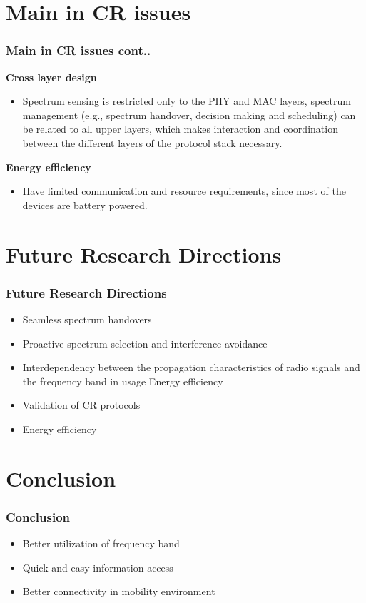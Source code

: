 \documentclass{beamer}
\begin{document}
\section{Main in CR issues}
\begin{frame}
\frametitle{Main in CR issues cont..}
\textbf{Cross layer design}\\
\begin{itemize}
\item Spectrum sensing is restricted only to the PHY and MAC layers, spectrum management (e.g., spectrum handover, decision making and scheduling) can be related to all upper layers, which makes interaction and coordination between the different layers of the protocol stack necessary.\\ 
\end{itemize}
\textbf{Energy efficiency}\\
\begin{itemize}
\item Have limited communication and resource requirements, since most of the devices are battery powered. 
\end{itemize}


\end{frame}


\section{Future Research Directions}
\begin{frame}
\frametitle{Future Research Directions}
\begin{itemize}
\item Seamless spectrum handovers
\item Proactive spectrum selection and interference avoidance
\item Interdependency between the propagation characteristics of radio signals and the frequency band in usage Energy efficiency
\item Validation of CR protocols\\
\item Energy efficiency
\end{itemize}
\end{frame}
\section{Conclusion}
\frametitle{Conclusion}
\begin{frame}
\begin{itemize}
\item Better utilization of frequency band
\item Quick and easy information access
\item Better connectivity in mobility environment\\ 

\end{itemize}
\end{frame}
\end{document}
